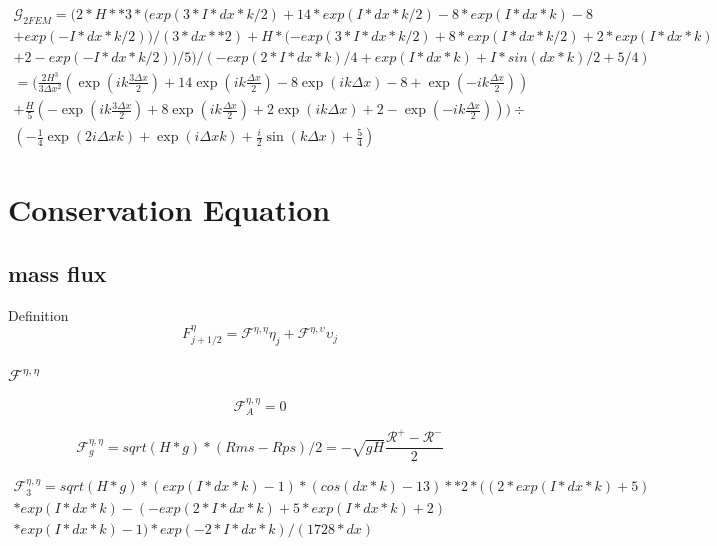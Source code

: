 \documentclass[12pt]{article}
\begin{document}
\begin{multline}
\mathcal{G}_{2FEM} = (2*H**3*(exp(3*I*dx*k/2) + 14*exp(I*dx*k/2) - 8*exp(I*dx*k) - 8 \\ + exp(-I*dx*k/2))/(3*dx**2) + H*(-exp(3*I*dx*k/2) + 8*exp(I*dx*k/2) + 2*exp(I*dx*k) \\+ 2 - exp(-I*dx*k/2))/5)/(-exp(2*I*dx*k)/4 + exp(I*dx*k) + I*sin(dx*k)/2 + 5/4) \\ =  \Bigg(\frac{2 H^3}{3 \Delta x ^2} \left(\exp\left(ik \frac{3\Delta x}{2}\right) + 14 \exp\left(ik \frac{\Delta x}{2}\right) - 8 \exp\left(ik\Delta x\right) - 8 + \exp\left(-ik \frac{\Delta x}{2}\right)\right) \\ + \frac{H}{5}\left(-\exp\left(ik \frac{3\Delta x}{2}\right) + 8 \exp\left(ik \frac{\Delta x}{2}\right) + 2\exp\left(ik \Delta x\right) + 2 - \exp\left(-ik \frac{\Delta x}{2}\right)\right) \Bigg) \div \\\left( - \frac{1}{4} \exp\left(2 i \Delta x k\right) + \exp\left(i \Delta x k\right) + \frac{i}{2} \sin\left(k\Delta x\right) + \frac{5}{4} \right) 
\end{multline}

\section{Conservation Equation}

 \subsection{mass flux}
 Definition
 \[F^{\eta}_{j+1/2} = \mathcal{F}^{\eta,\eta} \eta_j + \mathcal{F}^{\eta,\upsilon} \upsilon_j \]
 
 \subsubsection{$\mathcal{F}^{\eta,\eta}$}
 \[\mathcal{F}^{\eta,\eta}_A =  0\]
 
 \[\mathcal{F}^{\eta,\eta}_g = sqrt(H*g)*(Rms - Rps)/2 = -\sqrt{gH}\frac{\mathcal{R}^+ - \mathcal{R}^-}{2}\]
 
 \begin{multline*}
 \mathcal{F}^{\eta,\eta}_3 = sqrt(H*g)*(exp(I*dx*k) - 1)*(cos(dx*k) - 13)**2*((2*exp(I*dx*k) + 5)\\*exp(I*dx*k) - (-exp(2*I*dx*k) + 5*exp(I*dx*k) + 2)\\*exp(I*dx*k) - 1)*exp(-2*I*dx*k)/(1728*dx)
 \end{multline*}
 
\end{document}
